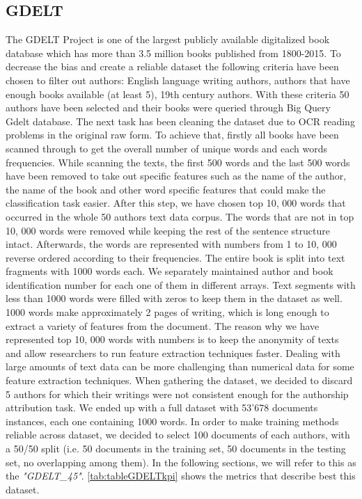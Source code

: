\subsection{GDELT}
The GDELT Project is one of the largest publicly available digitalized book database
which has more than 3.5 million books published from 1800-2015.
To decrease the bias and create a reliable dataset the following criteria have been
chosen to filter out authors: English language writing authors, authors that have
enough books available (at least 5), 19th century authors. With these criteria 50
authors have been selected and their books were queried through Big Query Gdelt
database. The next task has been cleaning the dataset due to OCR reading problems
in the original raw form. To achieve that, firstly all books have been scanned through
to get the overall number of unique words and each words frequencies. While scanning
the texts, the first 500 words and the last 500 words have been removed to take out
specific features such as the name of the author, the name of the book and other word
specific features that could make the classification task easier. After this step, we have
chosen top 10, 000 words that occurred in the whole 50 authors text data corpus. The
words that are not in top 10, 000 words were removed while keeping the rest of the
sentence structure intact. Afterwards, the words are represented with numbers from
1 to 10, 000 reverse ordered according to their frequencies. The entire book is split
into text fragments with 1000 words each. We separately maintained author and
book identification number for each one of them in different arrays. Text segments
with less than 1000 words were filled with zeros to keep them in the dataset as well.
1000 words make approximately 2 pages of writing, which is long enough to extract a variety of features from the document. The reason why we have represented top
10, 000 words with numbers is to keep the anonymity of texts and allow researchers
to run feature extraction techniques faster. Dealing with large amounts of text data
can be more challenging than numerical data for some feature extraction techniques.
When gathering the dataset, we decided to discard 5 authors for which their writings were not consistent enough for the authorship attribution task.
We ended up with a full dataset with 53'678 documents instances, each one containing 1000 words.
In order to make training methods reliable across dataset, we decided to select 100 documents of each authors, with a 50/50 split (i.e. 50 documents in the training set, 50 documents in the testing set, no overlapping among them). In the following sections, we will refer to this as the \textit{"GDELT\_45"}.
\autoref{tab:tableGDELTkpi} shows the metrics that describe best this dataset.


